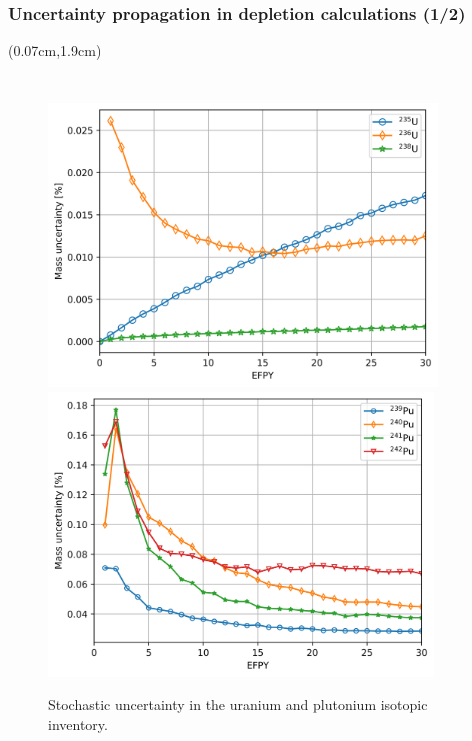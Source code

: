 \begin{frame}
\frametitle{Uncertainty propagation in depletion calculations (1/2)}
\begin{textblock*}{12.4cm}(0.07cm,1.9cm) %
	\begin{columns}
		\column[t]{5.5cm}
		\vspace{-3mm}
		{\begin{figure}[hbp!] %
				\includegraphics[width=0.92\textwidth]{../dissertation/figures/uq/serpent_mass_std_u.png}\\
				\vspace{-4.5mm}
				\hspace{+0.3mm}
				\includegraphics[width=0.91\textwidth]{../dissertation/figures/uq/serpent_mass_std_pu.png}
				\vspace{-3.5mm}
				\caption{Stochastic uncertainty in the uranium and plutonium 
				isotopic inventory.}
		\end{figure}}
		

\end{columns}
\end{textblock*}
\end{frame}
